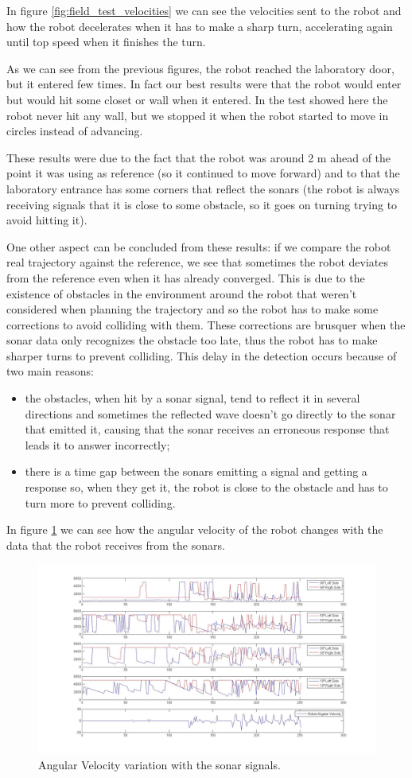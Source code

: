 \documentclass[11pt,a4paper]{scrartcl}
\begin{document}
In figure \ref{fig:field_test_velocities} we can see the velocities sent to the robot and how the robot decelerates when it has to make a sharp turn, accelerating again until top speed when it finishes the turn.

As we can see from the previous figures, the robot reached the laboratory door, but it entered few times. In fact our best results were that the robot would enter but would hit some closet or wall when it entered. In the test showed here the robot never hit any wall, but we stopped it when the robot started to move in circles instead of advancing.

These results were due to the fact that the robot was around 2 m ahead of the point it was using as reference (so it continued to move forward) and to that the laboratory entrance has some corners that reflect the sonars (the robot is always receiving signals that it is close to some obstacle, so it goes on turning trying to avoid hitting it).

One other aspect can be concluded from these results: if we compare the robot real trajectory against the reference, we see that sometimes the robot deviates from the reference even when it has already converged. This is due to the existence of obstacles in the environment around the robot that weren't considered when planning the trajectory and so the robot has to make some corrections to avoid colliding with them. These corrections are brusquer when the sonar data only recognizes the obstacle too late, thus the robot has to make sharper turns to prevent colliding. This delay in the detection occurs because of two main reasons:
\begin{itemize}
	\item the obstacles, when hit by a sonar signal, tend to reflect it in several directions and sometimes the reflected wave doesn't go directly to the sonar that emitted it, causing that the sonar receives an erroneous response that leads it to answer incorrectly;
    \item there is a time gap between the sonars emitting a signal and getting a response so, when they get it, the robot is close to the obstacle and has to turn more to prevent colliding.
\end{itemize}

In figure \ref{fig:sonar_map} we can see how the angular velocity of the robot changes with the data that the robot receives from the sonars.
\begin{figure}[H]
	\centering
	\includegraphics[width=0.7\linewidth]{sonar_map_section.jpg}
	\caption{Angular Velocity variation with the sonar signals.}
    \label{fig:sonar_map}
\end{figure}
\end{document}
